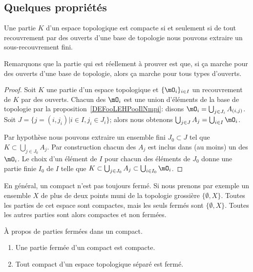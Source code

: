 \subsection{Quelques propriétés}

\begin{lemma}   \label{LemOWVooZKndbI}
    Une partie \( K\) d'un espace topologique est compacte si et seulement si de tout recouvrement par des ouverts d'une base de topologie nous pouvons extraire un sous-recouvrement fini.
\end{lemma}
Remarquons que la partie qui est réellement à prouver est que, si \og ça marche \fg{} pour des ouverts d'une base de topologie, alors \og ça marche\fg{} pour tous types d'ouverts.
\begin{proof}
    Soit \( K\) une partie d'un espace topologique et \( \{ \mO_i \}_{i\in I}\) un recouvrement de \( K\) par des ouverts. Chacun des \( \mO_i\) est une union d'éléments de la base de topologie par la proposition~\ref{DEFooLEHPooIlNmpi}: disons \( \mO_i = \bigcup_{j \in J_i} A_{(i,j)} \). Soit \( J = \{ j = (i, j_i) | i \in I, j_i \in J_i \} \); alors nous obtenons  \( \bigcup_{j\in J}A_j=\bigcup_{i\in I}\mO_i\).

    Par hypothèse nous pouvons extraire un ensemble fini \( J_0\subset J\) tel que \( K\subset\bigcup_{j\in J_0}A_j\). Par construction chacun des \( A_j\) est inclus dans (au moins) un des \( \mO_i\). Le choix d'un élément de \( I\) pour chacun des éléments de \( J_0\) donne une partie finie \( I_0\) de \( I\) telle que \( K\subset\bigcup_{j\in J_0}A_j\subset\bigcup_{i\in I_0}\mO_i\).
\end{proof}


\begin{example}
    En général, un compact n'est pas toujours fermé. Si nous prenons par exemple un ensemble \( X\) de plus de deux points muni de la topologie grossière \( \{ \emptyset,X \}\). Toutes les parties de cet espace sont compactes, mais les seuls fermés sont \( \{ \emptyset,X \}\). Toutes les autres parties sont alors compactes et non fermées.
\end{example}


\begin{lemma}   \label{LemnAeACf}
    À propos de parties fermées dans un compact.
    \begin{enumerate}
        \item       \label{ITEMooNKAKooQoNddr}
    Une partie fermée d'un compact est compacte.
\item       \label{ITEMooAZWVooLyPDeY}
    Tout compact d'un espace topologique séparé est fermé.
    \end{enumerate}
\end{lemma}

